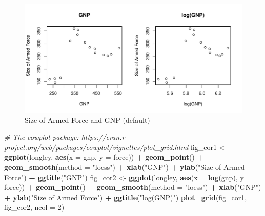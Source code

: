 \documentclass[11pt,]{article}
\newenvironment{Shaded}{\begin{snugshade}}{\end{snugshade}}
\newcommand{\KeywordTok}[1]{\textcolor[rgb]{0.13,0.29,0.53}{\textbf{#1}}}
\newcommand{\DataTypeTok}[1]{\textcolor[rgb]{0.13,0.29,0.53}{#1}}
\newcommand{\DecValTok}[1]{\textcolor[rgb]{0.00,0.00,0.81}{#1}}
\newcommand{\StringTok}[1]{\textcolor[rgb]{0.31,0.60,0.02}{#1}}
\newcommand{\CommentTok}[1]{\textcolor[rgb]{0.56,0.35,0.01}{\textit{#1}}}
\newcommand{\OperatorTok}[1]{\textcolor[rgb]{0.81,0.36,0.00}{\textbf{#1}}}
\newcommand{\NormalTok}[1]{#1}
\begin{document}
\begin{figure}[h!]

{\centering \includegraphics[width=0.9\linewidth]{figures/cor1-1} 

}

\caption{\label{fig:force-and-gnp1}Size of Armed Force and GNP (default)}\label{fig:cor1}
\end{figure}

\normalsize

\tiny

\begin{Shaded}
\begin{Highlighting}[]
\CommentTok{# The cowplot package: https://cran.r-project.org/web/packages/cowplot/vignettes/plot_grid.html}
\NormalTok{fig_cor1 <-}\StringTok{ }\KeywordTok{ggplot}\NormalTok{(longley, }\KeywordTok{aes}\NormalTok{(}\DataTypeTok{x =}\NormalTok{ gnp, }\DataTypeTok{y =}\NormalTok{ force)) }\OperatorTok{+}\StringTok{ }\KeywordTok{geom_point}\NormalTok{() }\OperatorTok{+}\StringTok{ }
\StringTok{  }\KeywordTok{geom_smooth}\NormalTok{(}\DataTypeTok{method =} \StringTok{"loess"}\NormalTok{) }\OperatorTok{+}\StringTok{ }\KeywordTok{xlab}\NormalTok{(}\StringTok{"GNP"}\NormalTok{) }\OperatorTok{+}\StringTok{ }\KeywordTok{ylab}\NormalTok{(}\StringTok{"Size of Armed Force"}\NormalTok{) }\OperatorTok{+}
\StringTok{  }\KeywordTok{ggtitle}\NormalTok{(}\StringTok{"GNP"}\NormalTok{)}
\NormalTok{fig_cor2 <-}\StringTok{ }\KeywordTok{ggplot}\NormalTok{(longley, }\KeywordTok{aes}\NormalTok{(}\DataTypeTok{x =} \KeywordTok{log}\NormalTok{(gnp), }\DataTypeTok{y =}\NormalTok{ force)) }\OperatorTok{+}\StringTok{ }\KeywordTok{geom_point}\NormalTok{() }\OperatorTok{+}\StringTok{ }
\StringTok{  }\KeywordTok{geom_smooth}\NormalTok{(}\DataTypeTok{method =} \StringTok{"loess"}\NormalTok{) }\OperatorTok{+}\StringTok{ }\KeywordTok{xlab}\NormalTok{(}\StringTok{"GNP"}\NormalTok{) }\OperatorTok{+}\StringTok{ }\KeywordTok{ylab}\NormalTok{(}\StringTok{"Size of Armed Force"}\NormalTok{) }\OperatorTok{+}
\StringTok{  }\KeywordTok{ggtitle}\NormalTok{(}\StringTok{"log(GNP)"}\NormalTok{)}
\KeywordTok{plot_grid}\NormalTok{(fig_cor1, fig_cor2, }\DataTypeTok{ncol =} \DecValTok{2}\NormalTok{)}
\end{Highlighting}
\end{Shaded}
\end{document}
